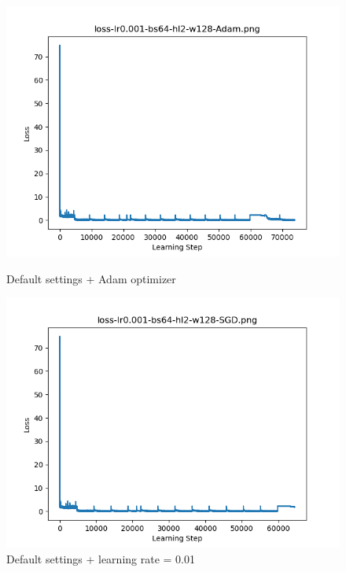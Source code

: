 \documentclass{article}[12pt]
\begin{document}
    \begin{figure}[H]
        \includegraphics[width=\linewidth]{testsResults/loss/optimizer/def.png}
        \caption{Default settings + Adam optimizer}
        \endminipage\hfill
        \includegraphics[width=\linewidth]{testsResults/loss/optimizer/loss-lr0.001-bs64-hl2-w128-SGD.png}
        \caption{Default settings + learning rate = 0.01}
        \endminipage
    \end{figure}
\end{document}
